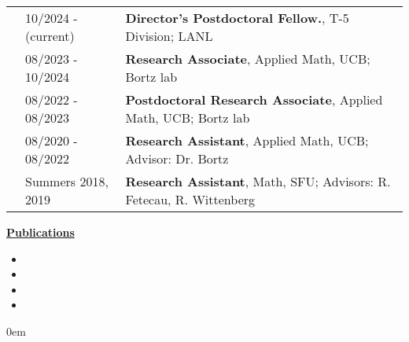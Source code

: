 \documentclass[letterpaper,11pt,oneside]{article}
\newcommand{\headr}[1]{\uline{\Large{\textbf{#1}} \hfill } \\ \vspace{-0.5cm}}
\begin{document}
\vspace{0.5cm}
\begin{tabular}{@{} p{0.01cm} @{} p{4cm} @{} p{16cm}@{} }
& 10/2024 - (current)  & 
\textbf{Director's Postdoctoral Fellow.}, T-5 Division; LANL \\
& 08/2023 - 10/2024  & 
\textbf{Research Associate}, Applied Math, UCB; Bortz lab \\
& 08/2022 - 08/2023 & 
\textbf{Postdoctoral Research Associate}, Applied Math, UCB; Bortz lab\\
& 08/2020 - 08/2022  & 
\textbf{Research Assistant}, Applied Math, UCB; 
Advisor: Dr. Bortz \\
& Summers 2018, 2019  & 
\textbf{Research Assistant}, Math, SFU; Advisors: R. Fetecau, R. Wittenberg
\end{tabular}
\vspace{0.5cm}




\headr{Publications}

\begin{itemize}
\itemsep0em 
\item {}
\item {}
\item {}
\item {}
\end{itemize}
\begin{enumerate}[label={[\arabic*]}]
\itemsep0em 
\item {}
\item {}
\item {}
\item {}
\item {}
\item {}
\item {}
\item {}
\item {}
\item {}
\item {}
\item {}
\item {}
\item {}
\item {}
\end{enumerate}
\end{document}
